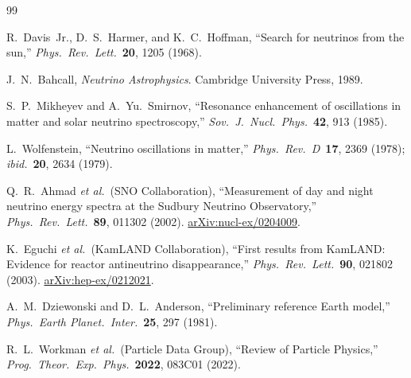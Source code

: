 \documentclass[12pt, a4paper]{article}
\begin{document}
\begin{thebibliography}{99}
 
    R.~Davis~Jr., D.~S.~Harmer, and K.~C.~Hoffman,
    ``Search for neutrinos from the sun,''
    \textit{Phys.\ Rev.\ Lett.}\ \textbf{20}, 1205 (1968).
 
    J.~N.~Bahcall,
    \textit{Neutrino Astrophysics}.
    Cambridge University Press, 1989.
 
    S.~P.~Mikheyev and A.~Yu.~Smirnov,
    ``Resonance enhancement of oscillations in matter and solar neutrino
    spectroscopy,''
    \textit{Sov.\ J.\ Nucl.\ Phys.}\ \textbf{42}, 913 (1985).
 
    L.~Wolfenstein,
    ``Neutrino oscillations in matter,''
    \textit{Phys.\ Rev.\ D}\ \textbf{17}, 2369 (1978);
    \textit{ibid.}\ \textbf{20}, 2634 (1979).
 
    Q.~R.~Ahmad \textit{et al.}\ (SNO Collaboration),
    ``Measurement of day and night neutrino energy spectra at the
    Sudbury Neutrino Observatory,''
    \textit{Phys.\ Rev.\ Lett.}\ \textbf{89}, 011302 (2002).
    \href{https://arxiv.org/abs/nucl-ex/0204009}{arXiv:nucl-ex/0204009}.
 
    K.~Eguchi \textit{et al.}\ (KamLAND Collaboration),
    ``First results from KamLAND: Evidence for reactor antineutrino
    disappearance,''
    \textit{Phys.\ Rev.\ Lett.}\ \textbf{90}, 021802 (2003).
    \href{https://arxiv.org/abs/hep-ex/0212021}{arXiv:hep-ex/0212021}.
 
    A.~M.~Dziewonski and D.~L.~Anderson,
    ``Preliminary reference Earth model,''
    \textit{Phys.\ Earth Planet.\ Inter.}\ \textbf{25}, 297 (1981).
 
    R.~L.~Workman \textit{et al.}\ (Particle Data Group),
    ``Review of Particle Physics,''
    \textit{Prog.\ Theor.\ Exp.\ Phys.}\ \textbf{2022}, 083C01 (2022).
 
\end{thebibliography}
 
\end{document}
